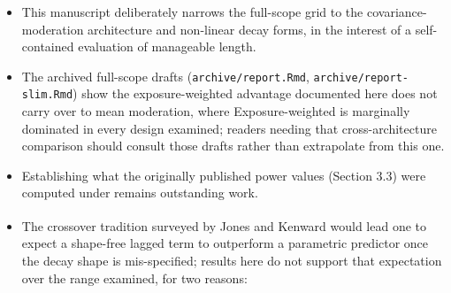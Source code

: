 \documentclass[
  11pt,
]{article}
\providecommand{\tightlist}{%
  \setlength{\itemsep}{0pt}\setlength{\parskip}{0pt}}
\begin{document}
\begin{itemize}
\tightlist
\item
  This manuscript deliberately narrows the full-scope grid to the
  covariance-moderation architecture and non-linear decay forms, in
  the interest of a self-contained evaluation of manageable length.
\item
  The archived full-scope drafts (\texttt{archive/report.Rmd},
  \texttt{archive/report-slim.Rmd}) show the exposure-weighted advantage
  documented here does not carry over to mean moderation, where
  Exposure-weighted is marginally dominated in every design examined;
  readers needing that cross-architecture comparison should consult
  those drafts rather than extrapolate from this one.
\item
  Establishing what the originally published power values (Section
  3.3) were computed under remains outstanding work.
\item
  The crossover tradition surveyed by Jones and Kenward\textsuperscript{} would lead one to expect a shape-free
  lagged term to outperform a parametric predictor once the decay
  shape is mis-specified; results here do not support that
  expectation over the range examined, for two reasons:


\end{itemize}
\end{document}
